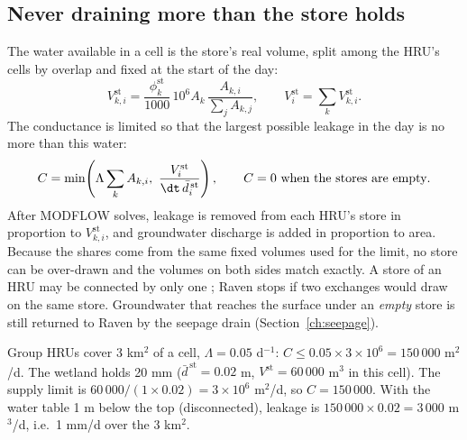 \subsection{Never draining more than the store holds}
The water available in a cell is the store's real volume, split among the HRU's cells by overlap and fixed at the start
of the day:
\begin{equation}
V^{\mathrm{st}}_{k,i}=\frac{\phi^{\mathrm{st}}_k}{1000}\,10^{6}A_k\,\frac{A_{k,i}}{\sum_jA_{k,j}},\qquad V^{\mathrm{st}}_i=\sum_kV^{\mathrm{st}}_{k,i} .
\end{equation}
The conductance is limited so that the largest possible leakage in the day is no more than this water:
\begin{equation}
C=\min\!\left(\Lambda\sum_kA_{k,i},\ \frac{V^{\mathrm{st}}_i}{\dt\,\bar d^{\,\mathrm{st}}_i}\right),\qquad C=0\ \text{when the stores are empty}.
\end{equation}
After MODFLOW solves, leakage is removed from each HRU's store in proportion to $V^{\mathrm{st}}_{k,i}$, and groundwater discharge is
added in proportion to area. Because the shares come from the same fixed volumes used for the limit, no store can be
over-drawn and the volumes on both sides match exactly. A store of an HRU may be connected by only one
; Raven stops if two exchanges would draw on the same store. Groundwater that reaches the surface under an \emph{empty} store is
still returned to Raven by the seepage drain (Section~\ref{ch:seepage}).
\begin{example}
Group HRUs cover 3 km$^2$ of a cell, $\Lambda=0.05$ d$^{-1}$: $C\le0.05\times3\times10^6=150\,000$ m$^2$/d. The wetland holds
20 mm ($\bar d^{\,\mathrm{st}}=0.02$ m, $V^{\mathrm{st}}=60\,000$ m$^3$ in this cell). The supply limit is $60\,000/(1\times0.02)=3\times10^6$ m$^2$/d, so
$C=150\,000$. With the water table 1 m below the top (disconnected), leakage is $150\,000\times0.02=3\,000$ m$^3$/d, i.e.\
1 mm/d over the 3 km$^2$.
\end{example}

